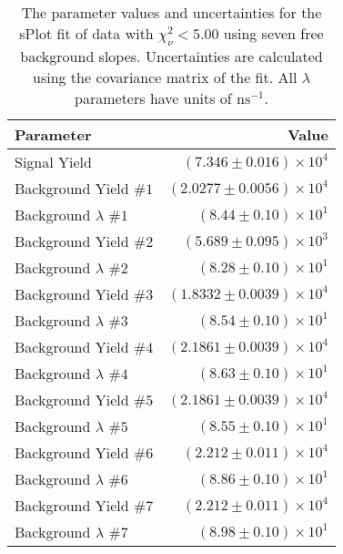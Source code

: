 
\begin{table}[ht]
    \begin{center}
        \begin{tabular}{lr}\toprule
            Parameter & Value \\\midrule
            Signal Yield & $(7.346 \pm 0.016) \times 10^{4}$ \\
            Background Yield $\#1$ & $(2.0277 \pm 0.0056) \times 10^{4}$ \\
            Background $\lambda$ $\#1$ & $(8.44 \pm 0.10) \times 10^{1}$ \\
            Background Yield $\#2$ & $(5.689 \pm 0.095) \times 10^{3}$ \\
            Background $\lambda$ $\#2$ & $(8.28 \pm 0.10) \times 10^{1}$ \\
            Background Yield $\#3$ & $(1.8332 \pm 0.0039) \times 10^{4}$ \\
            Background $\lambda$ $\#3$ & $(8.54 \pm 0.10) \times 10^{1}$ \\
            Background Yield $\#4$ & $(2.1861 \pm 0.0039) \times 10^{4}$ \\
            Background $\lambda$ $\#4$ & $(8.63 \pm 0.10) \times 10^{1}$ \\
            Background Yield $\#5$ & $(2.1861 \pm 0.0039) \times 10^{4}$ \\
            Background $\lambda$ $\#5$ & $(8.55 \pm 0.10) \times 10^{1}$ \\
            Background Yield $\#6$ & $(2.212 \pm 0.011) \times 10^{4}$ \\
            Background $\lambda$ $\#6$ & $(8.86 \pm 0.10) \times 10^{1}$ \\
            Background Yield $\#7$ & $(2.212 \pm 0.011) \times 10^{4}$ \\
            Background $\lambda$ $\#7$ & $(8.98 \pm 0.10) \times 10^{1}$ \\\bottomrule
        \end{tabular}
        \caption{The parameter values and uncertainties for the sPlot fit of data with $\chi^2_\nu < 5.00$ using seven free background slopes. Uncertainties are calculated using the covariance matrix of the fit. All $\lambda$ parameters have units of $\si{\nano\second}^{-1}$.}\label{tab:splot-fit-results-chisqdof-5.00-free-7}
    \end{center}
\end{table}
